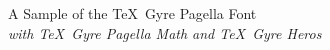 \documentclass[11pt]{article}
\begin{document}
{\LARGE \noindent A Sample of the \TeX\ Gyre Pagella Font}\\

{\large \noindent \textit{with \TeX\ Gyre Pagella Math and \TeX\ Gyre Heros}}\\[5pt]


\end{document}
